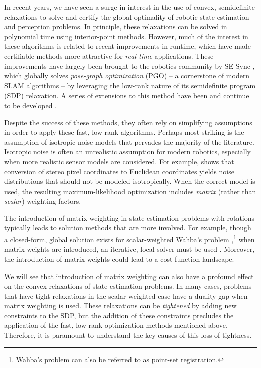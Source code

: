 \documentclass[lettersize,journal]{IEEEtran}
\newcommand{\rev}[1]{\color{red}{#1}\color{black}}
\begin{document}
In recent years, we have seen a surge in interest in the use of convex, semidefinite relaxations to solve and certify the global optimality of robotic state-estimation and perception problems. 
In principle, these relaxations can be solved in polynomial time using interior-point methods\cite{vandenbergheSemidefiniteProgramming1996}. However, much of the interest in these algorithms is related to recent improvements in runtime, which have made certifiable methods more attractive for \emph{real-time} applications. These improvements have largely been brought to the robotics community by SE-Sync \cite{rosenSESyncCertifiablyCorrect2019}, which globally solves \emph{pose-graph optimization} (PGO) -- a cornerstone of modern SLAM algorithms -- by leveraging the low-rank nature of its semidefinite program (SDP) relaxation. A series of extensions to this method have been and continue to be developed \cite{rosenAdvancesInferenceRepresentation2021}.

Despite the success of these methods, they often rely on simplifying assumptions in order to apply these fast, low-rank algorithms. Perhaps most striking is the assumption of isotropic noise models that pervades the majority of the literature. Isotropic noise is often an unrealistic assumption for modern robotics, especially when more realistic sensor models are considered. For example, \cite{matthiesErrorModelingStereo1987} shows that conversion of stereo pixel coordinates to Euclidean coordinates yields noise distributions that should not be modeled isotropically. When the correct model is used, the resulting maximum-likelihood optimization includes \emph{matrix} (rather than \emph{scalar}) weighting factors. 

The introduction of matrix weighting in state-estimation problems with rotations typically leads to solution methods that are more involved. For example, though a closed-form, global solution exists for scalar-weighted Wahba's problem \cite{hornClosedformSolutionAbsolute1987, hornClosedFormSolutionAbsolute1988, wahbaLeastSquaresEstimate1965},\footnote{Wahba's problem can also be referred to as point-set registration.} when matrix weights are introduced, an iterative, local solver must be used \cite{chengTotalLeastSquaresEstimate2019, barfootStateEstimationRobotics2017}. Moreover, the introduction of matrix weights could lead to a cost function landscape\rev{ with more local minima}. 

We will see that introduction of matrix weighting can also have a profound effect on the convex relaxations of state-estimation problems. In many cases, problems that have tight relaxations in the scalar-weighted case have a duality gap when matrix weighting is used. These relaxations can be \emph{tightened} by adding new constraints to the SDP, but the addition of these constraints precludes the application of the fast, low-rank optimization methods mentioned above. Therefore, it is paramount to understand the key causes of this loss of tightness.
\end{document}
